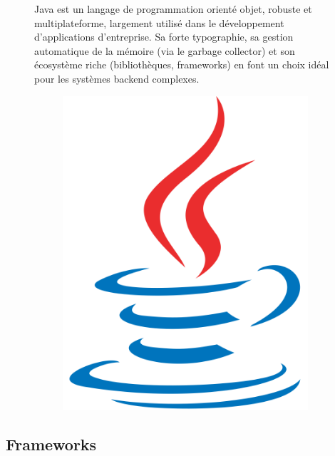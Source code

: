 \documentclass[12pt,a4paper]{report}
\begin{document}
	\begin{figure}[H]
		\begin{minipage}{0.8\textwidth}
			Java est un langage de programmation orienté objet, robuste et multiplateforme, largement utilisé dans le développement d'applications d'entreprise. Sa forte typographie, sa gestion automatique de la mémoire (via le garbage collector) et son écosystème riche (bibliothèques, frameworks) en font un choix idéal pour les systèmes backend complexes.
		\end{minipage}
		\hfill
		\begin{minipage}{0.15\textwidth}
			\begin{figure}[H]
				\centering
				\includegraphics[width=\linewidth]{java-logo.png}
				\label{fig:java-logo}
			\end{figure}			
		\end{minipage}
	\end{figure}
		
	\subsection{Frameworks}
	
\end{document}
